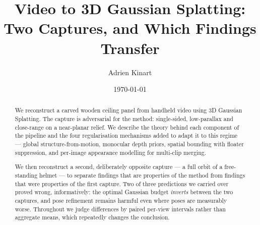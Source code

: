 \documentclass[11pt,a4paper]{article}
\title{Video to 3D Gaussian Splatting:\\Two Captures, and Which Findings Transfer}
\author{Adrien Kinart}
\date{\today}
\begin{document}
\maketitle

\begin{abstract}
We reconstruct a carved wooden ceiling panel from handheld video using 3D Gaussian
Splatting. The capture is adversarial for the method: single-sided, low-parallax
and close-range on a near-planar relief. We describe the theory behind each
component of the pipeline and the four regularisation mechanisms added to adapt it
to this regime --- global structure-from-motion, monocular depth priors, spatial
bounding with floater suppression, and per-image appearance modelling for
multi-clip merging.

We then reconstruct a second, deliberately opposite capture --- a full orbit of a
free-standing helmet --- to separate findings that are properties of the method from
findings that were properties of the first capture. Two of three predictions we carried
over proved wrong, informatively: the optimal Gaussian budget \emph{inverts} between the
two captures, and pose refinement remains harmful even where poses are measurably worse.
Throughout we judge differences by paired per-view intervals rather than aggregate means,
which repeatedly changes the conclusion.
\end{abstract}







\end{document}
